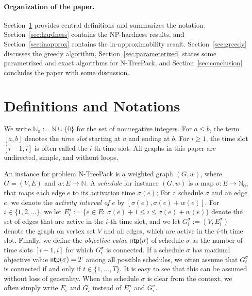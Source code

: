 \documentclass[runningheads]{llncs}
\newcommand{\N}{\mathbb{N}}
\newcommand{\set}[1]{\{ #1 \}}
\newcommand{\fromto}[2]{\set{#1, \ldots, #2}}
\DeclareMathOperator{\ntp}{\text{\sf ntp}}
\newcommand{\xxxNTP}{{\sc N-TreePack}}
\begin{document}
\paragraph{Organization of the paper.}
Section~\ref{sec:notation} provides central definitions and summarizes the notation.
Section~\ref{sec:hardness} contains the NP-hardness results, and 
Section~\ref{sec:inapprox} contains the in-approximability result.
Section~\ref{sec:greedy} discusses the greedy algorithm, 
Section~\ref{sec:parameterized} states some parametrized and exact algorithms for {\xxxNTP}, and
Section~\ref{sec:conclusion} concludes the paper with some discussion.


\section{Definitions and Notations}
\label{sec:notation}
We write $\N_0 := \N \cup \set{0}$ for the set of nonnegative integers. 
For $a\le b$, the term $[a,b]$ denotes the \emph{time slot} starting at $a$ and ending at $b$. 
For $i\ge1$, the time slot $[i-1,i]$ is often called the $i$-th time slot.
All graphs in this paper are undirected, simple, and without loops.

An instance for problem {\xxxNTP} is a weighted graph $(G,w)$, where $G=(V,E)$ and $w:E\to\N$. 
A \emph{schedule} for instance $(G,w)$ is a map $\sigma:E\to\N_0$, that maps each edge $e$ to its activation time $\sigma(e)$;
For a schedule $\sigma$ and an edge $e$, we denote the \emph{activity interval of $e$} by $[\sigma(e),\sigma(e)+w(e)]$. 
For $i\in\{1,2,\ldots\}$, we let $E^\sigma_i:= \set{e\in E:~ \sigma(e)+1 \le i
\le \sigma(e)+w(e)}$ denote 
the set of edges that are active in the $i$-th time slot, and we let $G^\sigma_i:= (V, E^\sigma_i)$ denote 
the graph on vertex set $V$ and all edges, which are active in the $i$-th time slot. 
Finally, we define the \emph{objective value} $\ntp(\sigma)$ of schedule $\sigma$ as the number of time 
slots $[i-1,i]$ for which $G^\sigma_i$ is connected. If a schedule $\sigma$ has maximal objective value $\ntp(\sigma) = T$ among all possible schedules, we often assume that $G^\sigma_t$ is connected if and only if $t \in \fromto{1}{T}$. It is easy to see that this can be assumed without loss of generality. When the schedule $\sigma$ is clear from the context, we often simply write $E_i$ and $G_i$ instead of 
$E^\sigma_i$ and $G^\sigma_i$. 
\end{document}
